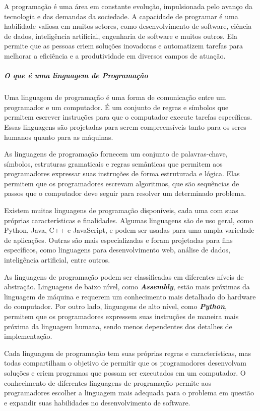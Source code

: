 \documentclass[a4paper, 12pt, onecolumn,singlespacing]{article}
\begin{document}
	A programação é uma área em constante evolução, impulsionada pelo avanço da tecnologia e das demandas da sociedade. A capacidade de programar é uma habilidade valiosa em muitos setores, como desenvolvimento de software, ciência de dados, inteligência artificial, engenharia de software e muitos outros. Ela permite que as pessoas criem soluções inovadoras e automatizem tarefas para melhorar a eficiência e a produtividade em diversos campos de atuação.
	
	\subparagraph{O que é uma linguagem de Programação} Uma linguagem de programação é uma forma de comunicação entre um programador e um computador. É um conjunto de regras e símbolos que permitem escrever instruções para que o computador execute tarefas específicas. Essas linguagens são projetadas para serem compreensíveis tanto para os seres humanos quanto para as máquinas.
	
	As linguagens de programação fornecem um conjunto de palavras-chave, símbolos, estruturas gramaticais e regras semânticas que permitem aos programadores expressar suas instruções de forma estruturada e lógica. Elas permitem que os programadores escrevam algoritmos, que são sequências de passos que o computador deve seguir para resolver um determinado problema.
	
	Existem muitas linguagens de programação disponíveis, cada uma com suas próprias características e finalidades. Algumas linguagens são de uso geral, como Python, Java, C++ e JavaScript, e podem ser usadas para uma ampla variedade de aplicações. Outras são mais especializadas e foram projetadas para fins específicos, como linguagens para desenvolvimento web, análise de dados, inteligência artificial, entre outros.
	
	As linguagens de programação podem ser classificadas em diferentes níveis de abstração. Linguagens de baixo nível, como \textit{\textbf{Assembly}}, estão mais próximas da linguagem de máquina e requerem um conhecimento mais detalhado do hardware do computador. Por outro lado, linguagens de alto nível, como \textbf{\textit{Python}}, permitem que os programadores expressem suas instruções de maneira mais próxima da linguagem humana, sendo menos dependentes dos detalhes de implementação.
	
	Cada linguagem de programação tem suas próprias regras e características, mas todas compartilham o objetivo de permitir que os programadores desenvolvam soluções e criem programas que possam ser executados em um computador. O conhecimento de diferentes linguagens de programação permite aos programadores escolher a linguagem mais adequada para o problema em questão e expandir suas habilidades no desenvolvimento de software.
	
\end{document}
